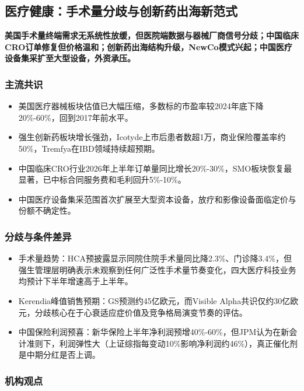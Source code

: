 \documentclass[11pt]{ctexart}
\begin{document}
\subsection{医疗健康：手术量分歧与创新药出海新范式}
\textbf{美国手术量终端需求无系统性放缓，但医院端数据与器械厂商信号分歧；中国临床CRO订单修复但价格温和；创新药出海结构升级，NewCo模式兴起；中国医疗设备集采扩至大型设备，外资承压。}
\subsubsection*{主流共识}
\begin{itemize}
  \item 美国医疗器械板块估值已大幅压缩，多数标的市盈率较2024年底下降20\%-60\%，回到2017年前水平。
  \item 强生创新药板块增长强劲，Icotyde上市后患者数超1万，商业保险覆盖率约50\%，Tremfya在IBD领域持续超预期。
  \item 中国临床CRO行业2026年上半年订单量同比增长20\%-30\%，SMO板块恢复最显著，已中标合同服务费和毛利回升5\%-10\%。
  \item 中国医疗设备集采范围首次扩展至大型资本设备，放疗和影像设备面临定价与份额不确定性。
\end{itemize}
\subsubsection*{分歧与条件差异}
\begin{itemize}
  \item 手术量趋势：HCA预披露显示同院住院手术量同比降2.3\%、门诊降3.4\%，但强生管理层明确表示未观察到任何广泛性手术量节奏变化，四大医疗科技业务均预计下半年增速高于上半年。
  \item Kerendia峰值销售预期：GS预测约45亿欧元，而Visible Alpha共识仅约30亿欧元，分歧核心在于心衰适应症价值及竞争格局演变节奏的评估。
  \item 中国保险利润预喜：新华保险上半年净利润预增40\%-60\%，但JPM认为在新会计准则下，利润弹性大（上证综指每变动10\%影响净利润约46\%），真正催化剂是中期分红是否上调。
\end{itemize}
\subsubsection*{机构观点}
\end{document}
